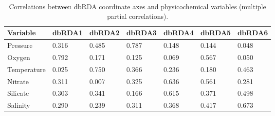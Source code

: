 \begin{table}[!ht]
\centering
\sffamily
\caption[Correlations between dbRDA axes and physicochemical variables]{Correlations between dbRDA coordinate axes and physicochemical variables (multiple partial correlations).}
\label{tab:dbRDAcorrs}
\begin{tabular}{lllllll}
\toprule
\textbf{Variable} & \textbf{dbRDA1} & \textbf{dbRDA2} & \textbf{dbRDA3} & \textbf{dbRDA4} & \textbf{dbRDA5} & \textbf{dbRDA6}\\
\midrule
Pressure & \textminus{}0.316 & \textminus{}0.485 & \textminus{}0.787 & \textminus{}0.148 & \textminus{}0.144 & \textminus{}0.048\\
Oxygen & 0.792 & \textminus{}0.171 & \textminus{}0.125 & 0.069 & \textminus{}0.567 & 0.050\\
Temperature & \textminus{}0.025 & \textminus{}0.750 & 0.366 & 0.236 & 0.180 & 0.463\\
Nitrate & \textminus{}0.311 & 0.007 & 0.325 & \textminus{}0.636 & \textminus{}0.561 & 0.281\\
Silicate & \textminus{}0.303 & 0.341 & \textminus{}0.166 & 0.615 & \textminus{}0.371 & 0.498\\
Salinity & \textminus{}0.290 & \textminus{}0.239 & 0.311 & 0.368 & \textminus{}0.417 & \textminus{}0.673\\
\bottomrule
\end{tabular}
\end{table}
